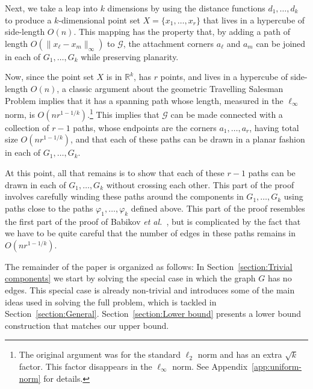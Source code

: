 \documentclass[11pt]{patmorin}
\newcommand{\etal}{\emph{et al.}}
\newcommand{\R}{\mathbb{R}}
\begin{document}
Next, we take a leap into $k$ dimensions by using the distance
functions $d_1,\ldots,d_k$ to produce a $k$-dimensional point set
$X=\{x_1,\ldots,x_r\}$ that lives in a hypercube of side-length $O(n)$.
This mapping has the property that, by adding a path of length $O(\|x_\ell
-x_m\|_\infty)$ to $\mathcal G$, the attachment corners $a_\ell$ and $a_m$
can be joined in each of $G_1,\ldots,G_k$ while preserving planarity.

Now, since the point set $X$ is in $\R^k$, has $r$ points, and lives in a
hypercube of side-length $O(n)$, a classic argument about the geometric
Travelling Salesman Problem \cite{few:shortest,moran:on} implies that it has a
spanning path whose length, measured in the $\ell_\infty$ norm, is
$O(nr^{1-1/k})$.\footnote{The original argument was for the standard
$\ell_2$ norm and has an extra $\sqrt{k}$ factor.  This factor disappears
in the $\ell_\infty$ norm.  See Appendix~\ref{app:uniform-norm} for details.}
This implies that $\mathcal G$ can be made connected with a collection
of $r-1$ paths, whose endpoints are the corners $a_1,\ldots,a_r$, having
total size $O(nr^{1-1/k})$, and that each of these paths can be
drawn in a planar fashion in each of $G_1,\ldots,G_k$.

At this point, all that remains is to show that each of these $r-1$ paths can
be drawn in each of $G_1,\ldots,G_k$ without crossing
each other.  This part of the proof involves carefully winding these
paths around the components in $G_1,\ldots,G_k$ using paths close
to the paths $\varphi_1,\ldots,\varphi_k$ defined above. This part
of the proof resembles the first part of the proof of Babikov \etal\
\cite{babikov.souvaine.ea:constructing}, but is complicated by the fact
that we have to be quite careful that the number of edges in these paths
remains in $O(nr^{1-1/k})$. 


The remainder of the paper is organized as follows: In
Section~\ref{section:Trivial components} we start by solving
the special case in which the graph $G$ has no edges. This
special case is already non-trivial and introduces some of the
main ideas used in solving the full problem, which is tackled in
Section~\ref{section:General}. Section~\ref{section:Lower bound}
presents a lower bound construction that matches our upper bound.
\end{document}
